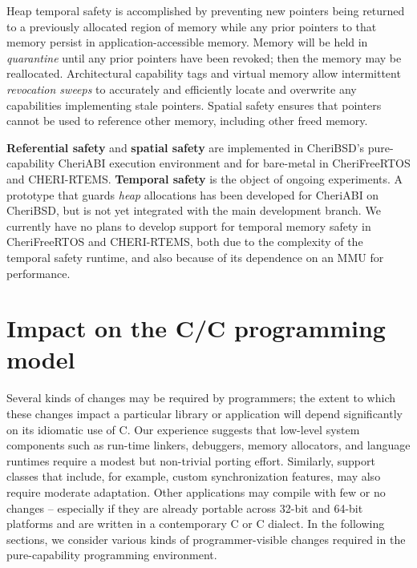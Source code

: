 \documentclass[12pt,twoside,openright,usletter]{article}
\newcommand{\note}[2]{{\color{blue}[ Note: #1 - #2]}}
\renewcommand{\note}[2]{\relax\ifhmode\unskip\fi}
\newcommand{\rwnote}[1]{\note{#1}{Robert W.}}
\newcommand{\psnote}[1]{\note{#1}{Peter S.}}
\newcommand*{\cpp}[1][]{C\textsmaller[2]{\nolinebreak[4]\hspace{-.05em}\raisebox{.45ex}{\textbf{++}}}}
\newcommand*{\cppInHeader}[1][]{\texorpdfstring{\cpp{}}{C++}}
\begin{document}
\begin{description}
  Heap temporal safety is accomplished by preventing new pointers being
  returned to a previously allocated region of memory while any prior pointers
  to that memory persist in application-accessible memory.
  Memory will be held in \textit{quarantine} until any prior pointers have
  been revoked; then the memory may be reallocated.
  Architectural capability tags and virtual memory allow intermittent
  \textit{revocation sweeps} to accurately and efficiently locate and
  overwrite any capabilities implementing stale pointers.
  Spatial safety ensures that pointers cannot be used to reference other
  memory, including other freed memory.
\end{description}


\textbf{Referential safety} and \textbf{spatial safety} are
implemented in CheriBSD's pure-capability CheriABI execution
environment and for bare-metal in CheriFreeRTOS and CHERI-RTEMS.
\textbf{Temporal safety} is the object of ongoing experiments.  A prototype
that
guards \emph{heap} allocations has been developed for CheriABI on CheriBSD, but
is not yet integrated with the main development branch.
We currently have no plans to develop support for temporal memory safety in
CheriFreeRTOS and CHERI-RTEMS, both due to the complexity of the temporal
safety runtime, and also because of its dependence on an MMU for performance.

%

\section{Impact on the C/\cppInHeader{} programming model}
\psnote{kinds/types, to avoid needless mental disambiguation}
Several kinds of changes may be required by programmers; the extent to which
these changes impact a particular library or application will depend
significantly on its idiomatic use of C.
Our experience suggests that low-level system components such as run-time
linkers, debuggers, memory allocators, and language runtimes require a modest
but non-trivial porting effort.
Similarly, support classes that include, for example, custom synchronization
features, may also require moderate adaptation.
Other applications may compile with few or no changes -- especially if they
are already portable across 32-bit and 64-bit platforms and are written in a contemporary C or \cpp{} dialect.
In the following sections, we consider various kinds of programmer-visible
changes required in the pure-capability programming environment.
\end{document}
